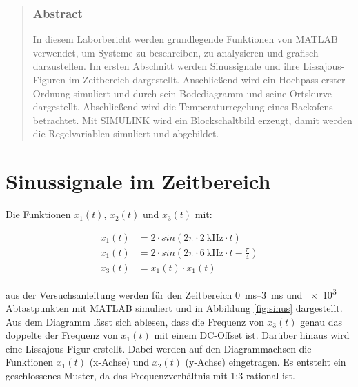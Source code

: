 \documentclass[
    paper=a4,
    fontsize=10pt,
    DIV=13,
    oneside,
]{scrartcl}
\date{\today}
\begin{document}
\maketitle


\begin{abstract}
    \noindent    
    \subsubsection*{Abstract}
        In diesem Laborbericht werden grundlegende Funktionen von MATLAB verwendet, um Systeme zu beschreiben, zu analysieren und grafisch darzustellen. Im ersten Abschnitt werden    Sinussignale und ihre Lissajous-Figuren im Zeitbereich dargestellt. Anschließend wird ein Hochpass erster Ordnung simuliert und durch sein Bodediagramm und seine Ortskurve dargestellt. Abschließend wird die Temperaturregelung eines Backofens betrachtet. Mit SIMULINK wird ein Blockschaltbild erzeugt, damit werden die Regelvariablen simuliert und abgebildet.
\end{abstract}


\section{Sinussignale im Zeitbereich}
    Die Funktionen \(x_1(t)\), \(x_2(t)\) und \(x_3(t)\) mit:

    \begin{align}
        x_1(t) &= 2 \cdot sin(2\pi \cdot \SI{2}{\kilo\hertz} \cdot t)\\
        x_1(t) &= 2 \cdot sin(2\pi \cdot \SI{6}{\kilo\hertz} \cdot t - \frac{\pi}{4})\\
        x_3(t) &= x_1(t) \cdot x_1(t)
    \end{align}

    \noindent
    aus der Versuchsanleitung \cite{versuch1} werden für den Zeitbereich \SIrange{0}{3}{\milli\second} und \num{e3} Abtastpunkten mit MATLAB simuliert und in Abbildung \ref{fig:sinus} dargestellt. Aus dem Diagramm lässt sich ablesen, dass die Frequenz von \(x_3(t)\) genau das doppelte der Frequenz von \(x_1(t)\) mit einem DC-Offset ist.
    Darüber hinaus wird eine Lissajous-Figur erstellt. Dabei werden auf den Diagrammachsen die Funktionen \(x_1(t)\) (x-Achse) und \(x_2(t)\) (y-Achse) eingetragen. Es entsteht ein geschlossenes Muster, da das Frequenzverhältnis mit 1:3 rational ist. 
\end{document}
